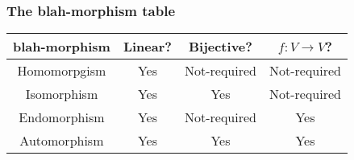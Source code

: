 \documentclass[12pt]{article}
\theoremstyle{definition}
\begin{document}
\subsubsection*{The blah-morphism table}
\begin{center}
    \begin{tabular}{| c || c | c | c |}
        \hline
        blah-morphism & Linear? & Bijective? & $f:V \rightarrow V$?\\
        \hline\hline
        Homomorpgism & Yes & Not-required & Not-required\\
        \hline
        Isomorphism & Yes & Yes & Not-required\\
        \hline
        Endomorphism & Yes & Not-required & Yes \\
        \hline
        Automorphism & Yes & Yes & Yes \\
        \hline 
    \end{tabular}
\end{center}
\end{document}
